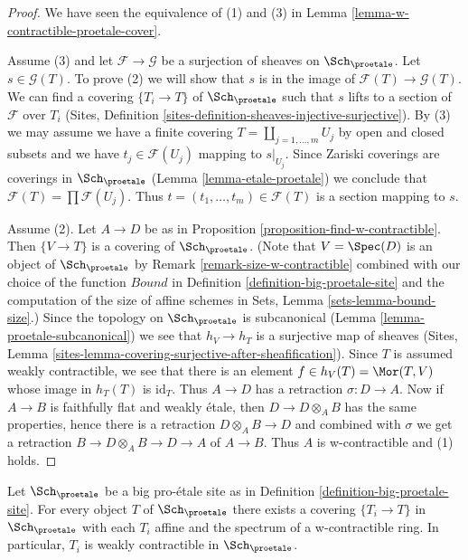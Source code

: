 \begin{proof}
We have seen the equivalence of (1) and (3) in
Lemma \ref{lemma-w-contractible-proetale-cover}.

\medskip\noindent
Assume (3) and let $\mathcal{F} \to \mathcal{G}$ be a surjection of sheaves on
$\Sch_\proetale$. Let $s \in \mathcal{G}(T)$. To prove (2) we will show that
$s$ is in the image of $\mathcal{F}(T) \to \mathcal{G}(T)$. We can find a
covering $\{T_i \to T\}$ of $\Sch_\proetale$ such that $s$ lifts
to a section of $\mathcal{F}$ over $T_i$
(Sites, Definition \ref{sites-definition-sheaves-injective-surjective}).
By (3) we may assume we have a finite covering
$T = \coprod_{j = 1, \ldots, m} U_j$ by open and closed subsets
and we have $t_j \in \mathcal{F}(U_j)$ mapping to $s|_{U_j}$.
Since Zariski coverings are coverings in $\Sch_\proetale$
(Lemma \ref{lemma-etale-proetale}) we conclude that
$\mathcal{F}(T) = \prod \mathcal{F}(U_j)$.
Thus $t = (t_1, \ldots, t_m) \in \mathcal{F}(T)$
is a section mapping to $s$.

\medskip\noindent
Assume (2). Let $A \to D$ be as in
Proposition \ref{proposition-find-w-contractible}.
Then $\{V \to T\}$ is a covering of $\Sch_\proetale$.
(Note that $V = \Spec(D)$ is an object of $\Sch_\proetale$
by Remark \ref{remark-size-w-contractible}
combined with our choice of the function
$Bound$ in Definition \ref{definition-big-proetale-site}
and the computation of the size of affine schemes in
Sets, Lemma \ref{sets-lemma-bound-size}.)
Since the topology on $\Sch_\proetale$ is subcanonical
(Lemma \ref{lemma-proetale-subcanonical})
we see that $h_V \to h_T$ is a surjective map of sheaves
(Sites, Lemma \ref{sites-lemma-covering-surjective-after-sheafification}).
Since $T$ is assumed weakly contractible, we see that there is an element
$f \in h_V(T) = \Mor(T, V)$ whose image in $h_T(T)$ is $\text{id}_T$.
Thus $A \to D$ has a retraction $\sigma : D \to A$.
Now if $A \to B$ is faithfully flat and weakly \'etale, then
$D \to D \otimes_A B$ has the same properties, hence
there is a retraction $D \otimes_A B \to D$ and combined
with $\sigma$ we get a retraction $B \to D \otimes_A B \to D \to A$
of $A \to B$. Thus $A$ is w-contractible and (1) holds.
\end{proof}

\begin{lemma}
\label{lemma-get-many-weakly-contractible}
Let $\Sch_\proetale$ be a big pro-\'etale site as in
Definition \ref{definition-big-proetale-site}.
For every object $T$ of $\Sch_\proetale$ there exists
a covering $\{T_i \to T\}$ in $\Sch_\proetale$
with each $T_i$ affine and the spectrum of a w-contractible
ring. In particular, $T_i$ is weakly contractible in $\Sch_\proetale$.
\end{lemma}

